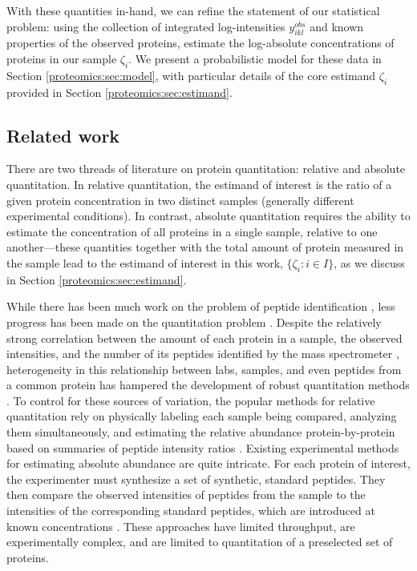 With these quantities in-hand, we can refine the statement of our statistical problem: using the collection of integrated log-intensities $y_{ikl}^{obs}$ and known properties of the observed proteins, estimate the log-absolute concentrations of proteins in our sample $\zeta_i$.
We present a probabilistic model for these data in Section \ref{proteomics:sec:model}, with particular details of the core estimand $\zeta_i$ provided in Section \ref{proteomics:sec:estimand}.



\subsection{Related work}

There are two threads of literature on protein quantitation: relative and absolute quantitation. 
In relative quantitation, the estimand of interest is the ratio of a given protein concentration in two distinct samples  (generally different experimental conditions).
In contrast, absolute quantitation requires the ability to estimate the concentration of all proteins in a single sample, relative to one another---these quantities together with the total amount of protein measured in the sample lead to the estimand of interest in this work, $\{\zeta_i:i\in I\}$, as we discuss in Section \ref{proteomics:sec:estimand}.


While there has been much work on the problem of peptide identification \citep[e.g.,][]{Cox:2008uu,Perkins:1999ed,Eng:1994fj}, less progress has been made on the quantitation problem \citep{Makawita:2010eg}.
Despite the relatively strong correlation between the amount of each protein in a sample, the observed intensities, and the number of its peptides identified by the mass spectrometer \citep{Old:2005jf}, heterogeneity in this relationship between labs, samples, and even peptides from a common protein has hampered the development of robust quantitation methods \citep{Tabb:2010bc,Bell:2009il}.
To control for these sources of variation, the popular methods for relative quantitation rely on physically labeling each sample being compared, analyzing them simultaneously, and estimating the relative abundance protein-by-protein based on summaries of peptide intensity ratios \citep{Ong:2002tf}.
%
Existing experimental methods for estimating absolute abundance are quite intricate.
For each protein of interest, the experimenter must synthesize a set of synthetic, standard peptides.
They then compare the observed intensities of peptides from the sample to the intensities of the corresponding standard peptides, which are introduced at known concentrations \citep{Gerber:2003kq}.
These approaches have limited throughput, are experimentally complex, and are limited to quantitation of a preselected set of proteins.

